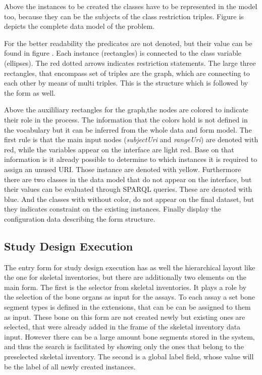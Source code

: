 


Above the instances to be created the classes have to be represented in the model too, because they can be the subjects of the class restriction triples.
 Figure  is depicts the complete data model of the problem.


For the better readability the predicates are not denoted, but their value can be found in figure . Each instance (rectangles) is connected to the class variable (ellipses). The red dotted arrows indicates restriction statements. The large three rectangles, that encompass set of triples are the graph, which are connecting to each other by means of multi triples. This is the structure which is followed by the form as well.




Above the auxililiary rectangles for the graph,the nodes are colored to indicate their role in the process. The information that the colors hold is not defined in the vocabulary but it can be inferred from the whole data and form model. The first rule is that the main input nodes (\textit{subjectUri} and \textit{rangeUri}) are denoted with red, while the variables appear on the interface are light red. Base on that information is it already possible to determine to which instances it is required to assign an unused URI. Those instance are denoted with yellow.
Furthermore there are two classes in the data model that do not appear on the interface, but their values can be evaluated through SPARQL queries. These are denoted with blue. And the classes with without color, do not appear on the final dataset, but they indicates constraint on the existing instances.
Finally  display the configuration data describing the form structure. 


\subsection{Study Design Execution} \label{43}


The entry form for study design execution has as well the hierarchical layout like the one for skeletal inventories, but there are additionally two elements on the main form. The first is the selector from skeletal inventories. It plays a role by the selection of the bone organs as input for the assays. To each assay a set bone segment types is defined in the extensions, that can be can be assigned to them as input. These bone on this form are not created newly but existing ones are selected, that were already added in the frame of the skeletal inventory data input.  However there can be a large amount bone segments stored in the system, and thus the search is facilitated by showing only the ones that belong to the preselected skeletal inventory. The second is a global label field, whose value will be the label of all newly created instances.




